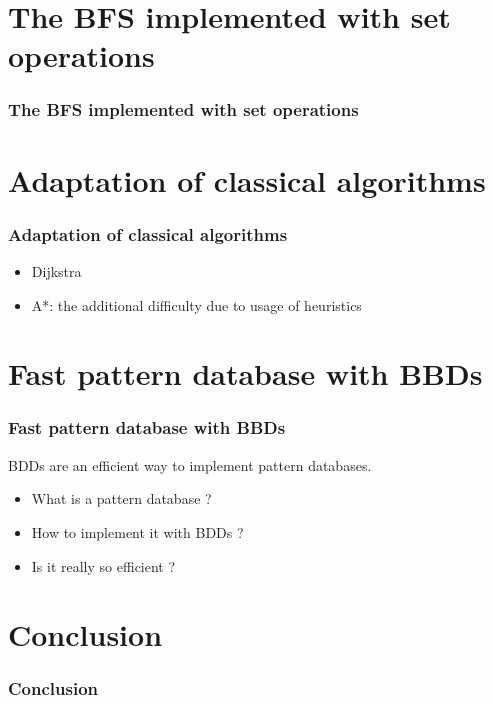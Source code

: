 \documentclass[10pt,a4paper]{beamer}
\begin{document}
\section{The BFS implemented with set operations}
\begin{frame}
\frametitle{The BFS implemented with set operations}
\end{frame}

\section{Adaptation of classical algorithms}
\begin{frame}
\frametitle{Adaptation of classical algorithms}

	\begin{itemize}
	\item Dijkstra
	\item A*: the additional difficulty due to usage of heuristics
	\end{itemize}
\end{frame}

\section{Fast pattern database with BBDs}
\begin{frame}
\frametitle{Fast pattern database with BBDs}

BDDs are an efficient way to implement pattern databases.
\begin{itemize}
\item What is a pattern database ?
\item How to implement it with BDDs ?
\item Is it really so efficient ?
\end{itemize}
\end{frame}

\section{Conclusion}
\begin{frame}
\frametitle{Conclusion}

\end{frame}
\end{document}
